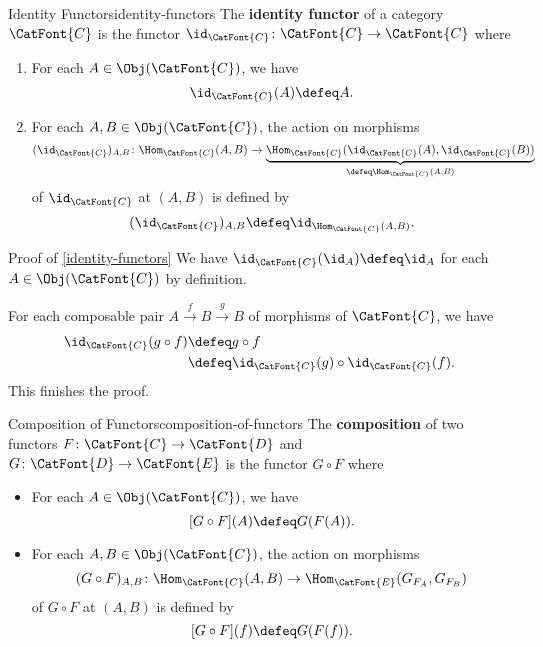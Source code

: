 \begin{example}{Identity Functors}{identity-functors}%
    The \textbf{identity functor} of a category $\CatFont{C}$ is the functor $\id_{\CatFont{C}}\colon\CatFont{C}\to\CatFont{C}$ where
    \begin{enumerate}
        \item{}For each $A\in\Obj(\CatFont{C})$, we have
            \[
                \id_{\CatFont{C}}(A)
                \defeq
                A.
            \]
        \item{}For each $A,B\in\Obj(\CatFont{C})$, the action on morphisms
            \[
                (\id_{\CatFont{C}})_{A,B}
                \colon
                \Hom_{\CatFont{C}}(A,B)
                \to
                \underbrace{\Hom_{\CatFont{C}}(\id_{\CatFont{C}}(A),\id_{\CatFont{C}}(B))}_{\defeq\Hom_{\CatFont{C}}(A,B)}
            \]%
            of $\id_{\CatFont{C}}$ at $(A,B)$ is defined by
            \[
                (\id_{\CatFont{C}})_{A,B}
                \defeq
                \id_{\Hom_{\CatFont{C}}(A,B)}.
            \]
    \end{enumerate}
\end{example}
\begin{Proof}{Proof of \cref{identity-functors}}%
    We have $\id_{\CatFont{C}}(\id_{A})\defeq\id_{A}$ for each $A\in\Obj(\CatFont{C})$ by definition.

    For each composable pair $A\xrightarrow{f}B\xrightarrow{g}B$ of morphisms of $\CatFont{C}$, we have
    \begin{align*}
        \id_{\CatFont{C}}(g\circ f) &\defeq g\circ f\\
                                    &\defeq \id_{\CatFont{C}}(g)\circ\id_{\CatFont{C}}(f).
    \end{align*}
    This finishes the proof.
\end{Proof}
\begin{definition}{Composition of Functors}{composition-of-functors}%
    The \textbf{composition} of two functors $F\colon\CatFont{C}\to\CatFont{D}$ and $G\colon\CatFont{D}\to\CatFont{E}$ is the functor $G\circ F$ where
    \begin{itemize}
        \item{}For each $A\in\Obj(\CatFont{C})$, we have
            \[
                [G\circ F](A)
                \defeq
                G(F(A)).
            \]%
        \item{}For each $A,B\in\Obj(\CatFont{C})$, the action on morphisms
            \[
                (G\circ F)_{A,B}
                \colon
                \Hom_{\CatFont{C}}(A,B)
                \to
                \Hom_{\CatFont{E}}(G_{F_{A}},G_{F_{B}})
            \]%
            of $G\circ F$ at $(A,B)$ is defined by
            \[
                [G\circ F](f)
                \defeq
                G(F(f)).
            \]%
    \end{itemize}
\end{definition}
